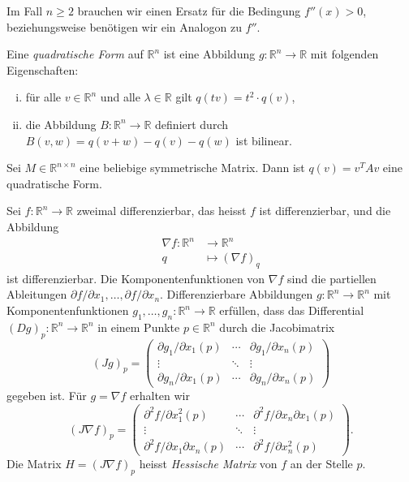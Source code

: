 \documentclass[../main.tex]{subfiles}
\begin{document}
Im Fall $n \geq 2$ brauchen wir einen
Ersatz für die Bedingung $f''(x) > 0$, beziehungsweise
benötigen wir ein Analogon zu $f''$.

\begin{definition}
  Eine \emph{quadratische Form} auf $\mathbb{R}^n$ 
  ist eine Abbildung $g \colon \mathbb{R}^n \to \mathbb{R}$ 
  mit folgenden Eigenschaften:
  \begin{enumerate}[(i)]
    \item für alle $v \in \mathbb{R}^n$ 
      und alle $\lambda \in \mathbb{R}$ gilt $q(tv) = t^2 \cdot q(v)$,
    \item die Abbildung 
      $B \colon \mathbb{R}^n \to \mathbb{R}$ 
      definiert durch $B(v, w) = q(v + w) - q(v) - q(w)$ 
      ist bilinear.
  \end{enumerate}
\end{definition}

\begin{example}
  Sei $M \in \mathbb{R}^{n \times n}$ eine beliebige 
  symmetrische Matrix.
  Dann ist $q(v) = v^T A v$ eine quadratische Form.
\end{example}

Sei $f \colon \mathbb{R}^n \to \mathbb{R}$ zweimal differenzierbar, das heisst
$f$ ist differenzierbar, und die Abbildung
\begin{align*}
  \nabla f \colon \mathbb{R}^n & \to \mathbb{R}^n \\
  q & \mapsto {(\nabla f)}_q
\end{align*}
ist differenzierbar.
Die Komponentenfunktionen von $\nabla f$ sind die
partiellen Ableitungen $\partial f / \partial x_1, \dots,
\partial f / \partial x_n$.
Differenzierbare Abbildungen
$g \colon \mathbb{R}^n \to \mathbb{R}^n$ mit
Komponentenfunktionen $g_1, \dots, g_n \colon \mathbb{R}^n \to \mathbb{R}$ 
erfüllen, dass das Differential ${(Dg)}_p \colon \mathbb{R}^n \to \mathbb{R}^n$ 
in einem Punkte $p \in \mathbb{R}^n$ durch die
Jacobimatrix 
\[
{(Jg)}_p =
\begin{pmatrix}
  \partial g_1 / \partial x_1 (p) & \cdots & \partial g_1/\partial x_n (p) \\
  \vdots & \ddots & \vdots \\
  \partial g_n / \partial x_1 (p) & \cdots & \partial g_n / \partial x_n (p)
\end{pmatrix}
\]
gegeben ist.
Für $g = \nabla f$ erhalten wir
\[
  {(J \nabla f )}_p =
  \begin{pmatrix}
    \partial^2 f / \partial x_1^2 (p) 
    & \cdots 
    & \partial^2 f / \partial x_n \partial x_1 (p) \\
    \vdots & \ddots & \vdots \\
    \partial^2 f / \partial x_1 \partial x_n (p)
    & \cdots
    & \partial^2 f / \partial x_n^2 (p)
  \end{pmatrix}.
\]
Die Matrix $H = {(J \nabla f)}_p$ heisst \emph{Hessische Matrix}
von $f$ an der Stelle $p$.
\end{document}
